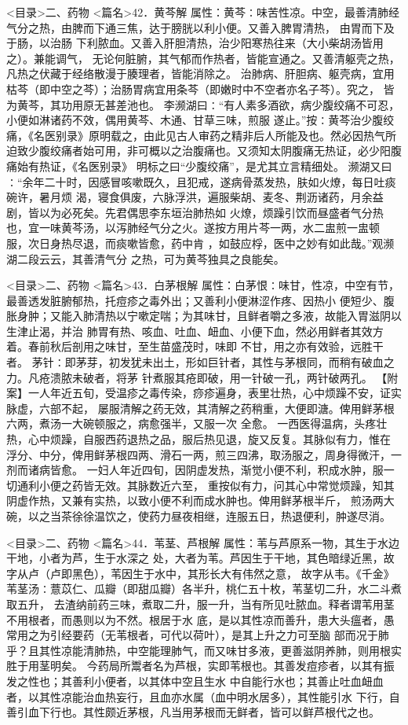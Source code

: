 \documentclass[a4paper,12pt,UTF8,twoside]{ctexbook}
\begin{document}
<目录>二、药物
<篇名>42．黄芩解
属性：黄芩∶味苦性凉。中空，最善清肺经气分之热，由脾而下通三焦，达于膀胱以利小便。又善入脾胃清热， 
由胃而下及于肠，以治肠 下利脓血。又善入肝胆清热，治少阳寒热往来（大小柴胡汤皆用之）。兼能调气， 
无论何脏腑，其气郁而作热者，皆能宣通之。又善清躯壳之热，凡热之伏藏于经络散漫于腠理者，皆能消除之。 
治肺病、肝胆病、躯壳病，宜用枯芩（即中空之芩）；治肠胃病宜用条芩（即嫩时中不空者亦名子芩）。究之， 
皆为黄芩，其功用原无甚差池也。 
李濒湖曰∶“有人素多酒欲，病少腹绞痛不可忍，小便如淋诸药不效，偶用黄芩、木通、甘草三味，煎服 
遂止。”按∶黄芩治少腹绞痛，《名医别录》原明载之，由此见古人审药之精非后人所能及也。然必因热气所 
迫致少腹绞痛者始可用，非可概以之治腹痛也。又须知太阴腹痛无热证，必少阳腹痛始有热证，《名医别录》 
明标之曰“少腹绞痛”，是尤其立言精细处。 
濒湖又曰∶“余年二十时，因感冒咳嗽既久，且犯戒，遂病骨蒸发热，肤如火燎，每日吐痰碗许，暑月烦 
渴，寝食俱废，六脉浮洪，遍服柴胡、麦冬、荆沥诸药，月余益剧，皆以为必死矣。先君偶思李东垣治肺热如 
火燎，烦躁引饮而昼盛者气分热也，宜一味黄芩汤，以泻肺经气分之火。遂按方用片芩一两，水二盅煎一盅顿 
服，次日身热尽退，而痰嗽皆愈，药中肯 ，如鼓应桴，医中之妙有如此哉。”观濒湖二段云云，其善清气分 
之热，可为黄芩独具之良能矣。 

<目录>二、药物
<篇名>43．白茅根解
属性：白茅恨∶味甘，性凉，中空有节，最善透发脏腑郁热，托痘疹之毒外出；又善利小便淋涩作疼、因热小 
便短少、腹胀身肿；又能入肺清热以宁嗽定喘；为其味甘，且鲜者嚼之多液，故能入胃滋阴以生津止渴，并治 
肺胃有热、咳血、吐血、衄血、小便下血，然必用鲜者其效方着。春前秋后剖用之味甘，至生苗盛茂时，味即 
不甘，用之亦有效验，远胜干者。 
茅针∶即茅芽，初发犹未出土，形如巨针者，其性与茅根同，而稍有破血之力。凡疮溃脓未破者，将茅 
针煮服其疮即破，用一针破一孔，两针破两孔。 
【附案】一人年近五旬，受温疹之毒传染，痧疹遍身，表里壮热，心中烦躁不安，证实脉虚，六部不起， 
屡服清解之药无效，其清解之药稍重，大便即溏。俾用鲜茅根六两，煮汤一大碗顿服之，病愈强半，又服一次 
全愈。 
一西医得温病，头疼壮热，心中烦躁，自服西药退热之品，服后热见退，旋又反复。其脉似有力，惟在 
浮分、中分，俾用鲜茅根四两、滑石一两，煎三四沸，取汤服之，周身得微汗，一剂而诸病皆愈。 
一妇人年近四旬，因阴虚发热，渐觉小便不利，积成水肿，服一切通利小便之药皆无效。其脉数近六至， 
重按似有力，问其心中常觉烦躁，知其阴虚作热，又兼有实热，以致小便不利而成水肿也。俾用鲜茅根半斤， 
煎汤两大碗，以之当茶徐徐温饮之，使药力昼夜相继，连服五日，热退便利，肿遂尽消。 

<目录>二、药物
<篇名>44．苇茎、芦根解
属性：苇与芦原系一物，其生于水边干地，小者为芦，生于水深之 
处，大者为苇。芦因生于干地，其色暗绿近黑，故字从卢（卢即黑色），苇因生于水中，其形长大有伟然之意， 
故字从韦。《千金》苇茎汤∶薏苡仁、瓜瓣（即甜瓜瓣）各半升，桃仁五十枚，苇茎切二升，水二斗煮取五升， 
去渣纳前药三味，煮取二升，服一升，当有所见吐脓血。释者谓苇用茎不用根者，而愚则以为不然。根居于水 
底，是以其性凉而善升，患大头瘟者，愚常用之为引经要药（无苇根者，可代以荷叶），是其上升之力可至脑 
部而况于肺乎？且其性凉能清肺热，中空能理肺气，而又味甘多液，更善滋阴养肺，则用根实胜于用茎明矣。 
今药局所鬻者名为芦根，实即苇根也。其善发痘疹者，以其有振发之性也；其善利小便者，以其体中空且生水 
中自能行水也；其善止吐血衄血者，以其性凉能治血热妄行，且血亦水属（血中明水居多），其性能引水 
下行，自善引血下行也。其性颇近茅根，凡当用茅根而无鲜者，皆可以鲜芦根代之也。 
\end{document}
